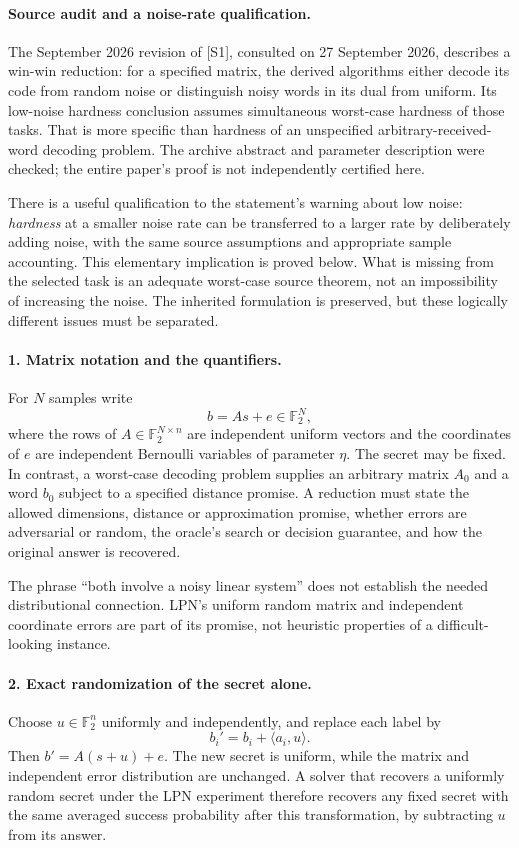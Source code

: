 \documentclass[11pt]{article}
\begin{document}
\paragraph{Source audit and a noise-rate qualification.}
The September 2026 revision of [S1], consulted on 27 September 2026, describes a win-win reduction: for a specified matrix, the derived algorithms either decode its code from random noise or distinguish noisy words in its dual from uniform. Its low-noise hardness conclusion assumes simultaneous worst-case hardness of those tasks. That is more specific than hardness of an unspecified arbitrary-received-word decoding problem. The archive abstract and parameter description were checked; the entire paper's proof is not independently certified here.

There is a useful qualification to the statement's warning about low noise: \emph{hardness} at a smaller noise rate can be transferred to a larger rate by deliberately adding noise, with the same source assumptions and appropriate sample accounting. This elementary implication is proved below. What is missing from the selected task is an adequate worst-case source theorem, not an impossibility of increasing the noise. The inherited formulation is preserved, but these logically different issues must be separated.

\paragraph{1. Matrix notation and the quantifiers.}
For $N$ samples write
\[
 b=As+e\in\mathbb F_2^N,
\]
where the rows of $A\in\mathbb F_2^{N\times n}$ are independent uniform vectors and the coordinates of $e$ are independent Bernoulli variables of parameter $\eta$. The secret may be fixed. In contrast, a worst-case decoding problem supplies an arbitrary matrix $A_0$ and a word $b_0$ subject to a specified distance promise. A reduction must state the allowed dimensions, distance or approximation promise, whether errors are adversarial or random, the oracle's search or decision guarantee, and how the original answer is recovered.

The phrase ``both involve a noisy linear system'' does not establish the needed distributional connection. LPN's uniform random matrix and independent coordinate errors are part of its promise, not heuristic properties of a difficult-looking instance.

\paragraph{2. Exact randomization of the secret alone.}
Choose $u\in\mathbb F_2^n$ uniformly and independently, and replace each label by
\[
 b_i'=b_i+\langle a_i,u\rangle.
\]
Then $b'=A(s+u)+e$. The new secret is uniform, while the matrix and independent error distribution are unchanged. A solver that recovers a uniformly random secret under the LPN experiment therefore recovers any fixed secret with the same averaged success probability after this transformation, by subtracting $u$ from its answer.
\end{document}
